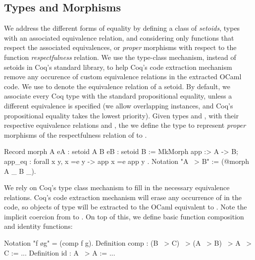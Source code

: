 \documentclass{llncs}
\begin{document}
\subsection{Types and Morphisms}
\label{sec:types-morphisms}
We address the different forms of equality by defining a class of
\emph{setoids}, types with an associated equivalence relation, and considering
only functions that respect the associated equivalences, or \emph{proper}
morphisms with respect to the function \emph{respectfulness} relation. We use
the type-class mechanism, instead of setoids in Coq's standard library, to help
Coq's code extraction mechanism remove any occurence of custom equivalence
relations in the extracted OCaml code. We use  to denote the equivalence
relation of a setoid. By default, we associate every Coq type with the standard
propositional equality, unless a different equivalence is specified (we allow
overlapping instances, and Coq's propositional equality takes the lowest
priority).
Given types  and  , with their respective
equivalence relations  and
, the we define the type
 to represent \emph{proper} morphisms of the
respectfulness relation of  to .
\begin{coqcode}
Record morph A {eA : setoid A} B {eB : setoid B} :=
  MkMorph { app :> A -> B; app_eq : forall x y, x =e y -> app x =e app y }.
Notation "A ~> B" := (@morph A _ B _).
\end{coqcode}
We rely on Coq's type class mechanism to fill in the necessary equivalence
relations. Coq's code extraction mechanism will erase any occurrence
of  in the code, so objects of type  will be extracted to
the OCaml equivalent to . Note the implicit coercion
from  to .
On top of this, we define basic function composition and identity functions:
\begin{coqcode}
Notation "f \o g" = (comp f g).
Definition comp : (B ~> C) ~> (A ~> B) ~> A ~> C := ...
Definition id : A ~> A := ...
\end{coqcode}
\end{document}
